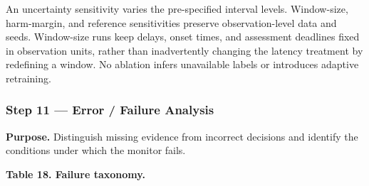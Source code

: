 \documentclass[
]{article}
\begin{document}
An uncertainty sensitivity varies the pre-specified interval levels.
Window-size, harm-margin, and reference sensitivities preserve
observation-level data and seeds. Window-size runs keep delays, onset
times, and assessment deadlines fixed in observation units, rather than
inadvertently changing the latency treatment by redefining a window. No
ablation infers unavailable labels or introduces adaptive retraining.

\hypertarget{step-11-error-failure-analysis}{%
\subsubsection{Step 11 --- Error / Failure
Analysis}\label{step-11-error-failure-analysis}}

\textbf{Purpose.} Distinguish missing evidence from incorrect decisions
and identify the conditions under which the monitor fails.

\textbf{Table 18. Failure taxonomy.}
\end{document}
